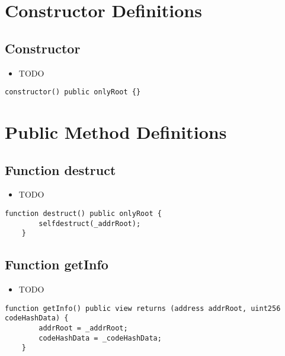 \section{Constructor Definitions}


\subsection{Constructor}

\begin{itemize}
\item TODO
\end{itemize}

\begin{lstlisting}[firstnumber=18]
    constructor() public onlyRoot {}
\end{lstlisting}

\section{Public Method Definitions}


\subsection{Function destruct}

\begin{itemize}
\item TODO
\end{itemize}

\begin{lstlisting}[firstnumber=25]
    function destruct() public onlyRoot {
        selfdestruct(_addrRoot);
    }
\end{lstlisting}

\subsection{Function getInfo}

\begin{itemize}
\item TODO
\end{itemize}

\begin{lstlisting}[firstnumber=20]
    function getInfo() public view returns (address addrRoot, uint256 codeHashData) {
        addrRoot = _addrRoot;
        codeHashData = _codeHashData;
    }
\end{lstlisting}
